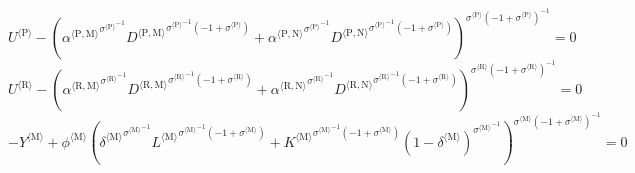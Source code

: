 \begin{equation}
{U}^{\langle \mathrm{P}\rangle} - \left({{{\alpha}^{\langle \mathrm{\mathrm{P}},\mathrm{\mathrm{M}}\rangle}}^{{{\sigma}^{\langle \mathrm{\mathrm{P}}\rangle}}^{-1}}} {{{D}^{\langle \mathrm{P},\mathrm{M}\rangle}}^{{{\sigma}^{\langle \mathrm{\mathrm{P}}\rangle}}^{-1} \left(-1 + {\sigma}^{\langle \mathrm{\mathrm{P}}\rangle}\right)}} + {{{\alpha}^{\langle \mathrm{\mathrm{P}},\mathrm{\mathrm{N}}\rangle}}^{{{\sigma}^{\langle \mathrm{\mathrm{P}}\rangle}}^{-1}}} {{{D}^{\langle \mathrm{P},\mathrm{N}\rangle}}^{{{\sigma}^{\langle \mathrm{\mathrm{P}}\rangle}}^{-1} \left(-1 + {\sigma}^{\langle \mathrm{\mathrm{P}}\rangle}\right)}}\right)^{{{\sigma}^{\langle \mathrm{\mathrm{P}}\rangle}} \left(-1 + {\sigma}^{\langle \mathrm{\mathrm{P}}\rangle}\right)^{-1}} = 0
\end{equation}
\begin{equation}
{U}^{\langle \mathrm{R}\rangle} - \left({{{\alpha}^{\langle \mathrm{\mathrm{R}},\mathrm{\mathrm{M}}\rangle}}^{{{\sigma}^{\langle \mathrm{\mathrm{R}}\rangle}}^{-1}}} {{{D}^{\langle \mathrm{R},\mathrm{M}\rangle}}^{{{\sigma}^{\langle \mathrm{\mathrm{R}}\rangle}}^{-1} \left(-1 + {\sigma}^{\langle \mathrm{\mathrm{R}}\rangle}\right)}} + {{{\alpha}^{\langle \mathrm{\mathrm{R}},\mathrm{\mathrm{N}}\rangle}}^{{{\sigma}^{\langle \mathrm{\mathrm{R}}\rangle}}^{-1}}} {{{D}^{\langle \mathrm{R},\mathrm{N}\rangle}}^{{{\sigma}^{\langle \mathrm{\mathrm{R}}\rangle}}^{-1} \left(-1 + {\sigma}^{\langle \mathrm{\mathrm{R}}\rangle}\right)}}\right)^{{{\sigma}^{\langle \mathrm{\mathrm{R}}\rangle}} \left(-1 + {\sigma}^{\langle \mathrm{\mathrm{R}}\rangle}\right)^{-1}} = 0
\end{equation}
\begin{equation}
-{Y}^{\langle \mathrm{M}\rangle} + {{\phi}^{\langle \mathrm{\mathrm{M}}\rangle}} {\left({{{\delta}^{\langle \mathrm{\mathrm{M}}\rangle}}^{{{\sigma}^{\langle \mathrm{\mathrm{M}}\rangle}}^{-1}}} {{{L}^{\langle \mathrm{M}\rangle}}^{{{\sigma}^{\langle \mathrm{\mathrm{M}}\rangle}}^{-1} \left(-1 + {\sigma}^{\langle \mathrm{\mathrm{M}}\rangle}\right)}} + {{{K}^{\langle \mathrm{M}\rangle}}^{{{\sigma}^{\langle \mathrm{\mathrm{M}}\rangle}}^{-1} \left(-1 + {\sigma}^{\langle \mathrm{\mathrm{M}}\rangle}\right)}} {\left(1 - {\delta}^{\langle \mathrm{\mathrm{M}}\rangle}\right)^{{{\sigma}^{\langle \mathrm{\mathrm{M}}\rangle}}^{-1}}}\right)^{{{\sigma}^{\langle \mathrm{\mathrm{M}}\rangle}} \left(-1 + {\sigma}^{\langle \mathrm{\mathrm{M}}\rangle}\right)^{-1}}} = 0
\end{equation}
